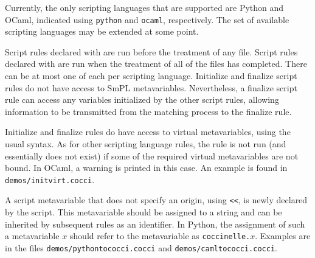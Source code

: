 \begin{grammar}

    


\end{grammar}

Currently, the only scripting languages that are supported are Python and
OCaml, indicated using {\tt python} and {\tt ocaml}, respectively.  The
set of available scripting languages may be extended at some point.

Script rules declared with  are run before the treatment of
any file.  Script rules declared with  are run when the
treatment of all of the files has completed.  There can be at most one of
each per scripting language.
Initialize and finalize script rules do not have access to SmPL
metavariables.  Nevertheless, a finalize script rule can access any
variables initialized by the other script rules, allowing information to be
transmitted from the matching process to the finalize rule.

Initialize and finalize rules do have access to virtual metavariables,
using the usual syntax.  As for other scripting language rules, the rule
is not run (and essentially does not exist) if some of the required virtual
metavariables are not bound.  In OCaml, a warning is printed in this case.
An example is found in {\tt demos/initvirt.cocci}.

A script metavariable that does not specify an origin, using \texttt{<{<}},
is newly declared by the script.  This metavariable should be assigned to a
string and can be inherited by subsequent rules as an identifier.  In
Python, the assignment of such a metavariable $x$ should refer to the
metavariable as {\tt coccinelle.\(x\)}.  Examples are in the files
\texttt{demos/pythontococci.cocci} and \texttt{demos/camltococci.cocci}.

